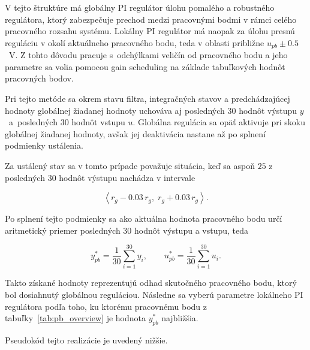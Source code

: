 V tejto štruktúre má globálny PI regulátor úlohu
pomalého a robustného regulátora,
ktorý zabezpečuje prechod medzi pracovnými bodmi
v rámci celého pracovného rozsahu systému.
Lokálny PI regulátor má naopak za úlohu
presnú reguláciu v okolí aktuálneho pracovného bodu,
teda v oblasti približne
$u_{pb} \pm 0.5$~V.
Z tohto dôvodu pracuje s~odchýlkami veličín od pracovného bodu
a jeho parametre sa volia pomocou gain scheduling
na základe tabuľkových hodnôt pracovných bodov.

Pri tejto metóde sa okrem stavu filtra,
integračných stavov a predchádzajúcej hodnoty globálnej žiadanej hodnoty
uchováva aj posledných $30$ hodnôt výstupu $y$~a~posledných $30$ hodnôt vstupu $u$.
Globálna regulácia sa opäť aktivuje pri skoku globálnej žiadanej hodnoty,
avšak jej deaktivácia nastane až po splnení podmienky ustálenia.

Za ustálený stav sa v tomto prípade považuje situácia,
keď sa aspoň $25$ z posledných $30$ hodnôt výstupu
nachádza v intervale

\begin{equation}
\left\langle r_g - 0.03\,r_g,\; r_g + 0.03\,r_g \right\rangle.
\label{eq:pi_switch_settling_band}
\end{equation}

Po splnení tejto podmienky
sa ako aktuálna hodnota pracovného bodu určí aritmetický priemer
posledných $30$ hodnôt výstupu a vstupu, teda

\begin{equation}
y_{pb}^{\ast} = \frac{1}{30}\sum_{i=1}^{30} y_i,
\qquad
u_{pb}^{\ast} = \frac{1}{30}\sum_{i=1}^{30} u_i.
\label{eq:pi_switch_estimated_operating_point}
\end{equation}

Takto získané hodnoty reprezentujú odhad skutočného pracovného bodu,
ktorý bol dosiahnutý globálnou reguláciou.
Následne sa vyberú parametre lokálneho PI regulátora
podľa toho,
ku ktorému pracovnému bodu z tabuľky~\ref{tab:pb_overview}
je hodnota $y_{pb}^{\ast}$ najbližšia.

Pseudokód tejto realizácie je uvedený nižšie.

